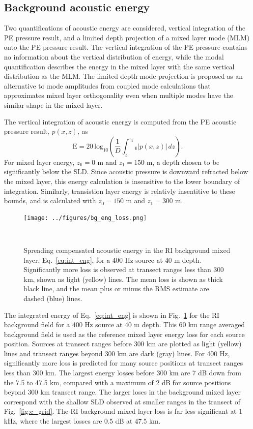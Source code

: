 \documentclass[preprint,NumberedRefs]{JASA}
\begin{document}
\subsection{Background acoustic energy}\label{ssec:bg}
Two quantifications of acoustic energy are considered, vertical integration of the PE pressure result, and a limited depth projection of a mixed layer mode (MLM) onto the PE pressure result. The vertical integration of the PE pressure contains no information about the vertical distribution of energy, while the modal quantification describes the energy in the mixed layer with the same vertical distribution as the MLM. The limited depth mode projection is proposed as an alternative to mode amplitudes from coupled mode calculations that approximates mixed layer orthogonality even when multiple modes have the similar shape in the mixed layer.

The vertical integration of acoustic energy is computed from the PE acoustic pressure result, $p(x, z)$, as
\begin{equation}
    \textrm{E} = 20 \, \textrm{log}_{10} \left( \frac{1}{D} \int^{z_1}_z_0 \left| p(x, z) \right| \,  dz \right).
    \label{eq:int_eng}
\end{equation}
For mixed layer energy, $z_0 = 0$ m and $z_1 = 150$ m, a depth chosen to be significantly below the SLD. Since acoustic pressure is downward refracted below the mixed layer, this energy calculation is insensitive to the lower boundary of integration. Similarly, transistion layer energy is relativly insentitive to these bounds, and is calculated with $z_0 = 150$ m and $z_1 = 300$ m.

\begin{figure}
\texttt{[image: ../figures/bg\_eng\_loss.png]}
    \caption{Spreading compensated acoustic energy in the RI background mixed layer, Eq.~\eqref{eq:int_eng}, for a 400 Hz source at 40 m depth. Significantly more loss is observed at transect ranges less than 300 km, shown as light (yellow) lines. The mean loss is shown as thick black line, and the mean plus or minus the RMS estimate are dashed (blue) lines.}
    \label{fig:bg_eng}
\end{figure}
The integrated energy of Eq.~\eqref{eq:int_eng} is shown in Fig.~\ref{fig:bg_eng} for the RI background field for a 400 Hz source at 40 m depth. This 60 km range averaged background field is used as the reference mixed layer energy loss for each source position. Sources at transect ranges before 300 km are plotted as light (yellow) lines and transect ranges beyond 300 km are dark (gray) lines. For 400 Hz, significantly more loss is predicted for many source positions at transect ranges less than 300 km. The largest energy losses before 300 km are 7 dB down from the 7.5 to 47.5 km, compared with a maximum of 2 dB for source positions beyond 300 km transect range. The larger loses in the background mixed layer correspond with the shallow SLD observed at smaller ranges in the transect of Fig.~\ref{fig:c_grid}. The RI background mixed layer loss is far less significant at 1 kHz, where the largest losses are 0.5 dB at 47.5 km.
\end{document}
